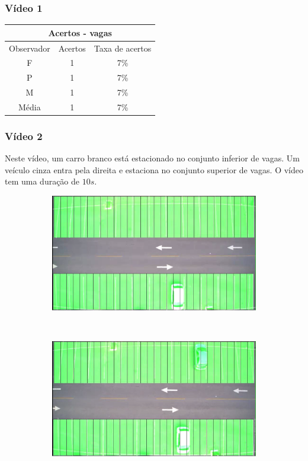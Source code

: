 \documentclass{beamer}
\begin{document}
\begin{frame}
\frametitle{Vídeo 1}
\begin{center}
\begin{tabular}{|c||c||c|}
\hline
\multicolumn{3}{|c|}{Acertos - vagas}  \\ \hline \hline
Observador & Acertos & Taxa de acertos \\ \hline
F & 1 & 7\% \\  \hline
P & 1 & 7\% \\ \hline
M & 1 & 7\% \\ \hline
Média & 1 & 7\% \\
\hline
\end{tabular}
\end{center}
\end{frame}

\begin{frame}
\frametitle{Vídeo 2}

Neste vídeo, um carro branco está estacionado no conjunto inferior de vagas. Um veículo cinza entra pela direita e estaciona no conjunto superior de vagas. O vídeo tem uma duração de $10s$.

\begin{figure}
\centering
\begin{subfigure}{.5\textwidth}
\centering
\includegraphics[width=.5\linewidth]{Video2Inicio}
\end{subfigure}\
\begin{subfigure}{.5\textwidth}
\centering
\includegraphics[width=.5\linewidth]{Video2Fim}
\end{subfigure}
\centering
\end{figure}	
\end{frame}
\end{document}
